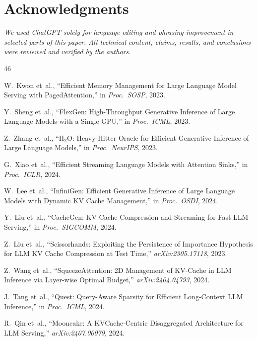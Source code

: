 \documentclass[conference]{IEEEtran}
\begin{document}
\section*{Acknowledgments}
\textit{We used ChatGPT solely for language editing and phrasing improvement in selected parts of this paper. All technical content, claims, results, and conclusions were reviewed and verified by the authors.}

\balance

\begin{thebibliography}{46}

 W.~Kwon et~al., ``Efficient Memory Management for Large Language Model Serving with PagedAttention,'' in \textit{Proc.\ SOSP}, 2023.

 Y.~Sheng et~al., ``FlexGen: High-Throughput Generative Inference of Large Language Models with a Single GPU,'' in \textit{Proc.\ ICML}, 2023.

 Z.~Zhang et~al., ``H$_2$O: Heavy-Hitter Oracle for Efficient Generative Inference of Large Language Models,'' in \textit{Proc.\ NeurIPS}, 2023.

 G.~Xiao et~al., ``Efficient Streaming Language Models with Attention Sinks,'' in \textit{Proc.\ ICLR}, 2024.

 W.~Lee et~al., ``InfiniGen: Efficient Generative Inference of Large Language Models with Dynamic KV Cache Management,'' in \textit{Proc.\ OSDI}, 2024.

 Y.~Liu et~al., ``CacheGen: KV Cache Compression and Streaming for Fast LLM Serving,'' in \textit{Proc.\ SIGCOMM}, 2024.

 Z.~Liu et~al., ``Scissorhands: Exploiting the Persistence of Importance Hypothesis for LLM KV Cache Compression at Test Time,'' \textit{arXiv:2305.17118}, 2023.

 Z.~Wang et~al., ``SqueezeAttention: 2D Management of KV-Cache in LLM Inference via Layer-wise Optimal Budget,'' \textit{arXiv:2404.04793}, 2024.

 J.~Tang et~al., ``Quest: Query-Aware Sparsity for Efficient Long-Context LLM Inference,'' in \textit{Proc.\ ICML}, 2024.

 R.~Qin et~al., ``Mooncake: A KVCache-Centric Disaggregated Architecture for LLM Serving,'' \textit{arXiv:2407.00079}, 2024.


\end{thebibliography}
\end{document}
